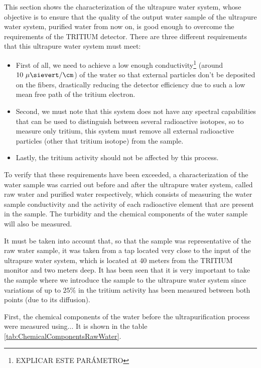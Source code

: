 This section shows the characterization of the ultrapure water system, whose objective is to ensure that the quality of the output water sample of the ultrapure water system, purified water from now on, is good enough to overcome the requirements of the TRITIUM detector. There are three different requirements that this ultrapure water system must meet:

\begin{itemize}
\item{} First of all, we need to achieve a low enough conductivity\footnote{EXPLICAR ESTE PARÁMETRO} (around $10~\mu\sievert/\cm$) of the water so that external particles don't be deposited on the fibers, drastically reducing the detector efficiency due to such a low mean free path of the tritium electron.

\item{} Second, we must note that this system does not have any spectral capabilities that can be used to distinguish between several radioactive isotopes, so to measure only tritium, this system must remove all external radioactive particles (other that tritium isotope) from the sample.

\item{} Lastly, the tritium activity should not be affected by this process. 

\end{itemize}

To verify that these requirements have been exceeded, a characterization of the water sample was carried out before and after the ultrapure water system, called raw water and purified water respectively, which consists of measuring the water sample conductivity and the activity of each radioactive element that are present in the sample. The turbidity and the chemical components of the water sample will also be measured.

It must be taken into account that, so that the sample was representative of the raw water sample, it was taken from a tap located very close to the input of the ultrapure water system, which is located at 40 meters from the TRITIUM monitor and two meters deep. It has been seen that it is very important to take the sample where we introduce the sample to the ultrapure water system since variations of up to $25\%$ in the tritium activity has been measured between both points (due to its diffusion).

First, the chemical components of the water before the ultrapurification process were measured using... It is shown in the table \ref{tab:ChemicalComponentsRawWater}.

